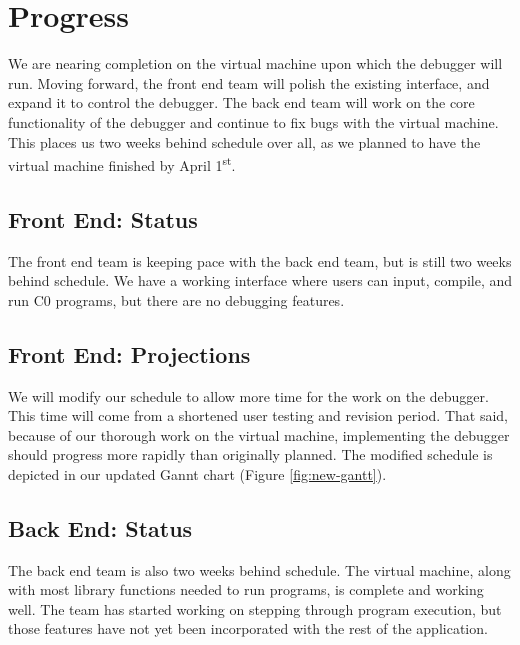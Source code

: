 \documentclass[11pt]{article}
\begin{document}
\section{Progress}
We are nearing completion on the virtual machine upon which the debugger will
run. Moving forward, the front end team will polish the existing interface, and
expand it to control the debugger. The back end team will work on the core
functionality of the debugger and continue to fix bugs with the virtual machine.
This places us two weeks behind schedule over all, as we planned to have the
virtual machine finished by April 1\textsuperscript{st}.
\subsection*{Front End: Status}
The front end team is keeping pace with the back end team, but is still two
weeks behind schedule. We have a working interface where users can input,
compile, and run C0 programs, but there are no debugging features.
\subsection*{Front End: Projections}
We will modify our schedule to allow more time for the work on the debugger.
This time will come from a shortened user testing and revision period. That
said, because of our thorough work on the virtual machine, implementing the
debugger should progress more rapidly than originally planned. The modified
schedule is depicted in our updated Gannt chart (Figure \ref{fig:new-gantt}).
\subsection*{Back End: Status}
The back end team is also two weeks behind schedule. The virtual machine, along
with most library functions needed to run programs, is complete and working
well. The team has started working on stepping through program execution, but
those features have not yet been incorporated with the rest of the application.
\end{document}
